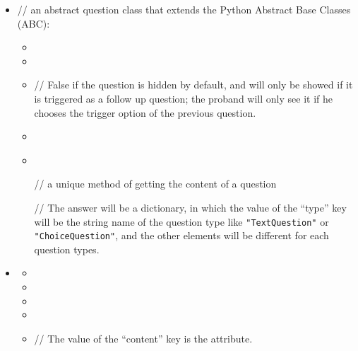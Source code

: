\documentclass[a4paper]{scrreprt}
\begin{document}
{\begin{itemize}
                    \item {}
                        \par // an abstract question class that extends the Python Abstract Base Classes (ABC): 
                        \begin{itemize}
                            \item {}
                            \item {}
                            \item {}
                                \par // False if the question is hidden by default, and will only be showed if it is triggered as a follow up question; the proband will only see it if he chooses the trigger option of the previous question.
                            \item {}
                            \item {} \\
                                \par // a unique method of getting the content of a question
                                \par // The answer will be a dictionary, in which the value of the “type” key will be the string name of the question type like \verb|"TextQuestion"| or \verb|"ChoiceQuestion"|, and the other elements will be different for each question types.
                        \end{itemize}

                    \item {}
                        \begin{itemize}
                            \item {}
                            \item {}
                            \item {}
                            \item {}
                            \item {}
                                \par // The value of the “content” key is the  attribute.
                        \end{itemize}


\end{itemize}}
\end{document}
